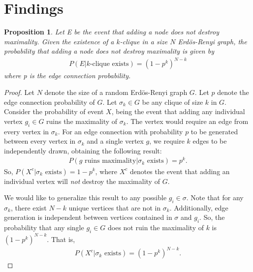 \documentclass{article}
\newtheorem{prop}[thm]{Proposition}
\theoremstyle{definition}
\theoremstyle{remark}
\begin{document}
\section{Findings}
\label{sec:Findings}
\begin{prop}
    Let E be the event that adding a node does not destroy maximality. Given the existence of a $k$-clique in a size $N$ Erd{\"o}s-Renyi graph, the probability that adding a node does not destroy maximality is given by
    \begin{align}
        \label{eq:e of max clique}
        P(E|k\text{-clique exists}) = (1-p^k)^{N-k}
    \end{align}
    where p is the edge connection probability.
\end{prop}
\begin{proof}
    Let $N$ denote the size of a random Erd{\"o}s-Renyi graph $G$. Let $p$ denote the edge connection probability of $G$. Let $\sigma_k\in G$ be any clique of size $k$ in $G$. Consider the probability of event $X$, being the event that adding any individual vertex $g_i\in G$ ruins the maximality of $\sigma_k$. The vertex would require an edge from every vertex in $\sigma_k$. For an edge connection with probability $p$ to be generated between every vertex in $\sigma_k$ and a single vertex $g$, we require $k$ edges to be independently drawn, obtaining the following result:
    \begin{align}
        \label{eq:}
        P \left(g \text{ ruins maximality}|\sigma_k \text{ exists} \right) = p^k.
    \end{align}
    So, $P(X^c|\sigma_k \text{ exists}) = 1-p^k$, where $X^c$ denotes the event that adding an individual vertex will \textit{not} destroy the maximality of $G$.

    We would like to generalize this result to any possible $g_i\in\sigma$. Note that for any $\sigma_k$, there exist $N-k$ unique vertices that are not in $\sigma_k$. Additionally, edge generation is independent between vertices contained in $\sigma$ and $g_i$. So, the probability that any single $g_i\in G$ does not ruin the maximality of $k$ is $(1-p^k)^{N-k}$. That is,
    \begin{align}
        \label{eq:}
        P \left( X^c|\sigma_k \text{ exists} \right) = (1-p^k)^{N-k}.
    \end{align}
\end{proof}
\end{document}
